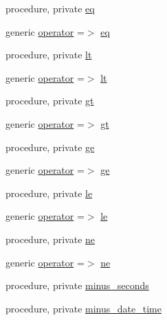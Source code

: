 \begin{DoxyCompactItemize}
\item 
procedure, private \mbox{\hyperlink{structm__time_1_1date__time_ac1002f3185c442747e93479fe136c725}{eq}}
\item 
generic \mbox{\hyperlink{structm__time_1_1date__time_a67028b37f0375d0209cb6379c59d99e5}{operator}} =$>$ \mbox{\hyperlink{structm__time_1_1date__time_ac1002f3185c442747e93479fe136c725}{eq}}
\item 
procedure, private \mbox{\hyperlink{structm__time_1_1date__time_aa4f036a923d45e10e6f6251945b375ad}{lt}}
\item 
generic \mbox{\hyperlink{structm__time_1_1date__time_afd5a2b9837bc8d48eb244bd07c200c6a}{operator}} =$>$ \mbox{\hyperlink{structm__time_1_1date__time_aa4f036a923d45e10e6f6251945b375ad}{lt}}
\item 
procedure, private \mbox{\hyperlink{structm__time_1_1date__time_aadb4377349cd5d9b003b1287d276dddf}{gt}}
\item 
generic \mbox{\hyperlink{structm__time_1_1date__time_a1aa01f75ae1f67a4b3202febd56b462f}{operator}} =$>$ \mbox{\hyperlink{structm__time_1_1date__time_aadb4377349cd5d9b003b1287d276dddf}{gt}}
\item 
procedure, private \mbox{\hyperlink{structm__time_1_1date__time_ac81a50f7827211f12a738e1acc278f51}{ge}}
\item 
generic \mbox{\hyperlink{structm__time_1_1date__time_a3961b17820108c6eb0037d11a03cfcd2}{operator}} =$>$ \mbox{\hyperlink{structm__time_1_1date__time_ac81a50f7827211f12a738e1acc278f51}{ge}}
\item 
procedure, private \mbox{\hyperlink{structm__time_1_1date__time_a3733467846b084981cf74e4f3d615c13}{le}}
\item 
generic \mbox{\hyperlink{structm__time_1_1date__time_add9b1c423294accdf967e22fa61a7796}{operator}} =$>$ \mbox{\hyperlink{structm__time_1_1date__time_a3733467846b084981cf74e4f3d615c13}{le}}
\item 
procedure, private \mbox{\hyperlink{structm__time_1_1date__time_a4d9e08f2f8d3c8a9f3442297900891ec}{ne}}
\item 
generic \mbox{\hyperlink{structm__time_1_1date__time_af93a94ed420ca7ba08cc63c36e88459c}{operator}} =$>$ \mbox{\hyperlink{structm__time_1_1date__time_a4d9e08f2f8d3c8a9f3442297900891ec}{ne}}
\item 
procedure, private \mbox{\hyperlink{structm__time_1_1date__time_a54751a9b71d326e9ff2398031fcf0de9}{minus\+\_\+seconds}}
\item 
procedure, private \mbox{\hyperlink{structm__time_1_1date__time_a590025bad9fe71932ef3d06ca4a3c613}{minus\+\_\+date\+\_\+time}}

\end{DoxyCompactItemize}
